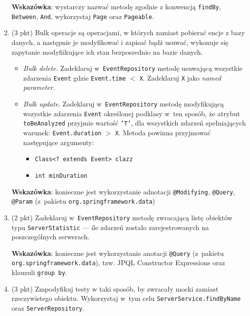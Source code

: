 \documentclass[12pt]{article}
\begin{document}
\begin{enumerate}
            \textbf{Wskazówka}: wystarczy nazwać metodę zgodnie z konwencją \texttt{findBy}, \texttt{Between}, \texttt{And}, wykorzystaj \texttt{Page} oraz \texttt{Pageable}.

        \item
            (3 pkt) Bulk operacje są operacjami, w których zamiast pobierać encje z bazy danych, a następnie je modyfikować i zapisać bądź usuwać, wykonuje się zapytanie modyfiikujące ich stan bezposrednio na bazie danych.
        \begin{itemize}
            \item \emph{Bulk delete}. Zadeklaruj w~\texttt{EventRepository} metodę usuwającą wszystkie zdarzenia \texttt{Event} gdzie \texttt{Event.time} $<$ \texttt{X}. Zadeklaruj \texttt{X} jako \emph{named parameter}.
            \item \emph{Bulk update}. Zadeklaruj w~\texttt{EventRepository} metodę modyfikującą wszystkie zdarzenia \texttt{Event} określonej podklasy w~ten sposób, że atrybut \texttt{toBeAnalyzed} przyjmie wartość \texttt{'T'}, dla wszystkich zdarzeń spełniających warunek: \texttt{Event.duration} $>$ \texttt{X}. Metoda powinna przyjmować następujące argumenty:
            \begin{itemize}
                \item \texttt{Class<? extends Event> clazz}
                \item \texttt{int minDuration}
            \end{itemize}
        \end{itemize}
            \textbf{Wskazówka}: konieczne jest wykorzystanie adnotacji \texttt{@Modifying}, \texttt{@Query}, \texttt{@Param} (z~pakietu \texttt{org\allowbreak .spring\-frame\-work\allowbreak .data})


        \item
            (2 pkt) Zadeklaruj w~\texttt{EventRepository} metodę zwracającą listę obiektów typu \texttt{Ser\-ver\-Statis\-tic} --- ile zdarzeń zostało zarejestrowanych na poszczególnych serwerach.

            \textbf{Wskazówka}: konieczne jest wykorzystanie anotacji \texttt{@Query} (z~pakietu \texttt{org\allowbreak .spring\-frame\-work\allowbreak .data}), tzw. JPQL Constructor Expressions oraz klauzuli \texttt{group by}.

        \item
            (3 pkt) Zmpodyfikuj testy w taki sposób, by zwracały mocki zamiast rzeczywistego obiektu. Wykorzystaj w~tym celu \texttt{ServerService.findByName} oraz \texttt{ServerRepository}.


\end{enumerate}
\end{document}
